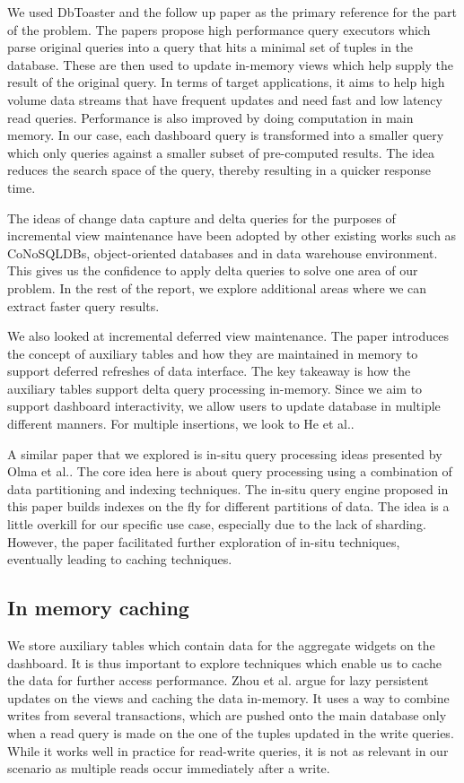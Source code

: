We used DbToaster\cite{DbToaster} and the follow up paper\cite{DbToaster2} as the primary reference for the part of the problem. The papers propose high performance query executors which parse original queries into a query that hits a minimal set of tuples in the database. These are then used to update in-memory views which help supply the result of the original query. In terms of target applications, it aims to help high volume data streams that have frequent updates and need fast and low latency read queries. Performance is also improved by doing computation in main memory. In our case, each dashboard query is transformed into a smaller query which only queries against a smaller subset of pre-computed results. The idea reduces the search space of the query, thereby resulting in a quicker response time.

The ideas of change data capture and delta queries for the purposes of incremental view maintenance have been adopted by other existing works such as CoNoSQLDBs\cite{DeltaNoSQL}\cite{CDC-CoNoSQL}, object-oriented databases\cite{ObjectOriented-IVM} and in data warehouse environment\cite{IVM-Algorithm}. This gives us the confidence to apply delta queries to solve one area of our problem. In the rest of the report, we explore additional areas where we can extract faster query results.

We also looked at incremental deferred view maintenance\cite{IDeferredVM}. The paper introduces the concept of auxiliary tables and how they are maintained in memory to support deferred refreshes of data interface. The key takeaway is how the auxiliary tables support delta query processing in-memory. Since we aim to support dashboard interactivity, we allow users to update database in multiple different manners. For multiple insertions, we look to He et al.\cite{BatchIVM}.

A similar paper that we explored is in-situ query processing ideas presented by Olma et al.\cite{InSitu}. The core idea here is about query processing using a combination of data partitioning and indexing techniques. The in-situ query engine proposed in this paper builds indexes on the fly for different partitions of data. The idea is a little overkill for our specific use case, especially due to the lack of sharding. However, the paper facilitated further exploration of in-situ techniques, eventually leading to caching techniques.

\subsection{In memory caching}
We store auxiliary tables which contain data for the aggregate widgets on the dashboard. It is thus important to explore techniques which enable us to cache the data for further access performance. Zhou et al.\cite{LazyViews} argue for lazy persistent updates on the views and caching the data in-memory. It uses a way to combine writes from several transactions, which are pushed onto the main database only when a read query is made on the one of the tuples updated in the write queries. While it works well in practice for read-write queries, it is not as relevant in our scenario as multiple reads occur immediately after a write.

